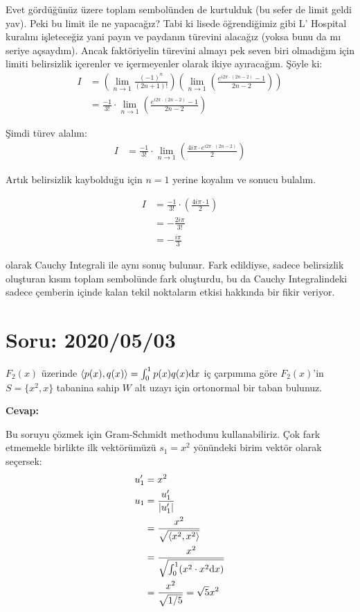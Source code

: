 \documentclass{article}
\numberwithin{equation}{section}
\begin{document}
Evet gördüğünüz üzere toplam sembolünden de kurtulduk (bu sefer de limit geldi yav). Peki bu limit ile ne yapacağız? Tabi ki lisede öğrendiğimiz gibi L' Hospital kuralını işleteceğiz yani payın ve paydanın türevini alacağız (yoksa bunu da mı seriye açsaydım). Ancak faktöriyelin türevini almayı pek seven biri olmadığım için limiti belirsizlik içerenler ve içermeyenler olarak ikiye ayıracağım. Şöyle ki: 
\begin{align}
I&= \left(\lim_{n \to 1} \frac{(-1)^n}{(2n+1)!} \right) \left(\lim_{n \to 1}\left( \frac{ e^{i2\pi\cdot (2n-2)} -  1  }{2n-2}\right)\right) \nonumber \\
&= \frac{-1}{3!} \cdot \lim_{n \to 1}\left( \frac{ e^{i2\pi\cdot (2n-2)} -  1  }{2n-2}\right)
\end{align} 

Şimdi türev alalım: 
\begin{align}
I&= \frac{-1}{3!} \cdot \lim_{n \to 1}\left( \frac{ 4i\pi\cdot e^{i2\pi\cdot (2n-2)}  }{2}\right)
\end{align} 

Artık belirsizlik kaybolduğu için $n=1$ yerine koyalım ve sonucu bulalım. 

\begin{align}
I&= \frac{-1}{3!} \cdot \left( \frac{ 4i\pi\cdot 1}{2}\right) \nonumber \\
&= -\frac{2i\pi}{3!}  \nonumber \\ 
&= -\frac{i\pi}{3}
\end{align}

olarak Cauchy Integrali ile aynı sonuç bulunur. Fark edildiyse, sadece belirsizlik oluşturan kısım toplam sembolünde fark oluşturdu, bu da Cauchy Integralindeki sadece çemberin içinde kalan tekil noktaların etkisi hakkında bir fikir veriyor. 

\section{Soru: 2020/05/03}
$F_2(x)$ üzerinde $\braket{p(x),q(x)} = \int_{0}^{1}p(x)q(x)\mathrm{d}x$ iç çarpımına göre $F_2(x)$'in $S=\{x^2,x\}$ tabanina sahip $W$ alt uzayı için ortonormal bir taban bulunuz. 

\textbf{Cevap: }

Bu soruyu çözmek için Gram-Schmidt methodunu kullanabiliriz. Çok fark etmemekle birlikte ilk vektörümüzü $s_1 = x^2$ yönündeki birim vektör olarak seçersek: 
%
\begin{align}
	u_1^\prime &= x^2 \\
	u_1 &= \frac{u_1^\prime}{|u_1^\prime|} \nonumber\\
	&= \frac{x^2}{\sqrt{\braket{x^2,x^2}}}\nonumber \\
	&= \frac{x^2}{\sqrt{\int_{0}^{1}(x^2\cdot x^2 \mathrm{d}x)}} \nonumber \\
	&= \frac{x^2}{\sqrt{1/5}} = \sqrt{5}x^2 
\end{align}
\end{document}
